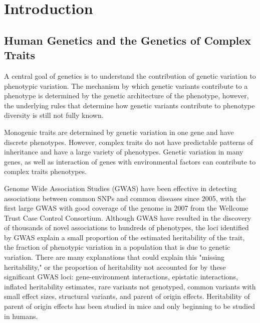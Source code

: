 \chapter{Introduction}

\section{Human Genetics and the Genetics of Complex Traits}

A central goal of genetics is to understand the contribution of genetic variation to phenotypic variation. The mechanism by which genetic variants contribute to a phenotype is determined by the genetic architecture of the phenotype, however, the underlying rules that determine how genetic variants contribute to phenotype diversity is still not fully known. 

Monogenic traits are determined by genetic variation in one gene and have discrete phenotypes. However, complex traits do not have predictable patterns of inheritance and have a large variety of phenotypes. Genetic variation in many genes, as well as interaction of genes with environmental factors can contribute to complex traits phenotypes. 

Genome Wide Association Studies (GWAS) have been effective in detecting associations between common SNPs and common diseases since 2005, with the first large GWAS with good coverage of the genome in 2007 from the Wellcome Trust Case Control Consortium\cite{WellcomeTrustCaseControlConsortium:2007do}. Although GWAS have resulted in the discovery of thousands of novel associations to hundreds of phenotypes, the loci identified by GWAS explain a small proportion of the estimated heritability of the trait, the fraction of phenotypic variation in a population that is due to genetic variation. There are many explanations that could explain this "missing heritability," or the proportion of heritability not accounted for by these significant GWAS loci: gene-environment interactions, epistatic interactions, inflated heritability estimates, rare variants not genotyped, common variants with small effect sizes, structural variants, and parent of origin effects\cite{Zaitlen2013,Eichler:2010kd,Gibson:2012kc,Zuk:cc}. Heritability of parent of origin effects has been studied in mice\cite{Mott2014} and only beginning to be studied in humans\cite{Laurin:2017jv}. 

